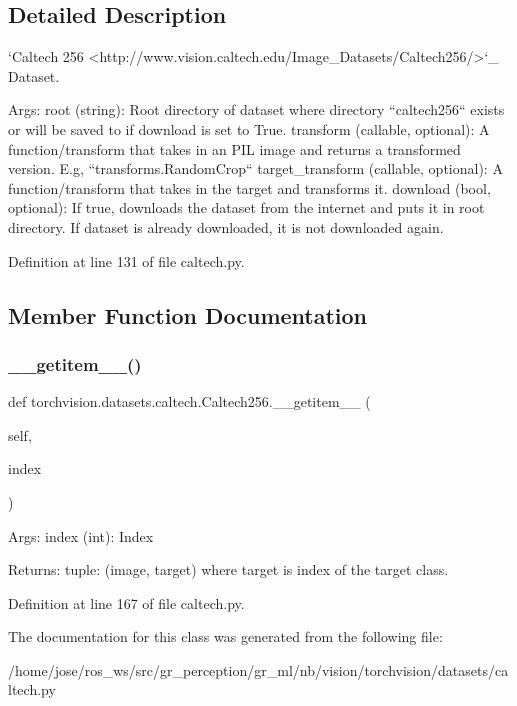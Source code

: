 \subsection{Detailed Description}
\begin{DoxyVerb}`Caltech 256 <http://www.vision.caltech.edu/Image_Datasets/Caltech256/>`_ Dataset.

Args:
    root (string): Root directory of dataset where directory
        ``caltech256`` exists or will be saved to if download is set to True.
    transform (callable, optional): A function/transform that takes in an PIL image
        and returns a transformed version. E.g, ``transforms.RandomCrop``
    target_transform (callable, optional): A function/transform that takes in the
        target and transforms it.
    download (bool, optional): If true, downloads the dataset from the internet and
        puts it in root directory. If dataset is already downloaded, it is not
        downloaded again.
\end{DoxyVerb}
 

Definition at line 131 of file caltech.\+py.



\subsection{Member Function Documentation}
\mbox{\label{classtorchvision_1_1datasets_1_1caltech_1_1Caltech256_ae52450820a61e9056b9c8480c768c876}} 
\subsubsection{\texorpdfstring{\+\_\+\+\_\+getitem\+\_\+\+\_\+()}{\_\_getitem\_\_()}}
{\footnotesize\ttfamily def torchvision.\+datasets.\+caltech.\+Caltech256.\+\_\+\+\_\+getitem\+\_\+\+\_\+ (\begin{DoxyParamCaption}\item[{}]{self,  }\item[{}]{index }\end{DoxyParamCaption})}

\begin{DoxyVerb}Args:
    index (int): Index

Returns:
    tuple: (image, target) where target is index of the target class.
\end{DoxyVerb}
 

Definition at line 167 of file caltech.\+py.



The documentation for this class was generated from the following file\+:\begin{DoxyCompactItemize}
\item 
/home/jose/ros\+\_\+ws/src/gr\+\_\+perception/gr\+\_\+ml/nb/vision/torchvision/datasets/caltech.\+py\end{DoxyCompactItemize}
